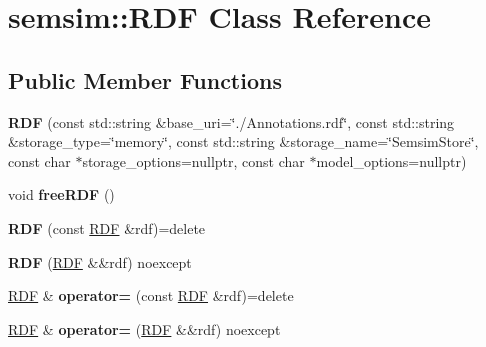 \hypertarget{classsemsim_1_1RDF}{}\section{semsim\+:\+:R\+DF Class Reference}
\label{classsemsim_1_1RDF}
\subsection*{Public Member Functions}
\begin{DoxyCompactItemize}
\item 
\mbox{\label{classsemsim_1_1RDF_adb3d644393c659dc3cd54b29d6bfaec0}} 
{\bfseries R\+DF} (const std\+::string \&base\+\_\+uri=\char`\"{}./Annotations.\+rdf\char`\"{}, const std\+::string \&storage\+\_\+type=\char`\"{}memory\char`\"{}, const std\+::string \&storage\+\_\+name=\char`\"{}Semsim\+Store\char`\"{}, const char $\ast$storage\+\_\+options=nullptr, const char $\ast$model\+\_\+options=nullptr)
\item 
\mbox{\label{classsemsim_1_1RDF_aefd8c1ee16d47a49ce3e2828b7671866}} 
void {\bfseries free\+R\+DF} ()
\item 
\mbox{\label{classsemsim_1_1RDF_a1d640ed0ead4d4699c59641a32f6a81a}} 
{\bfseries R\+DF} (const \hyperlink{classsemsim_1_1RDF}{R\+DF} \&rdf)=delete
\item 
\mbox{\label{classsemsim_1_1RDF_ad6e8d742af0aff97c89746a8eaf50777}} 
{\bfseries R\+DF} (\hyperlink{classsemsim_1_1RDF}{R\+DF} \&\&rdf) noexcept
\item 
\mbox{\label{classsemsim_1_1RDF_a6a8c2040f0fb2be58380d09ff396f11e}} 
\hyperlink{classsemsim_1_1RDF}{R\+DF} \& {\bfseries operator=} (const \hyperlink{classsemsim_1_1RDF}{R\+DF} \&rdf)=delete
\item 
\mbox{\label{classsemsim_1_1RDF_a0195811b138d141d7944ed475b098189}} 
\hyperlink{classsemsim_1_1RDF}{R\+DF} \& {\bfseries operator=} (\hyperlink{classsemsim_1_1RDF}{R\+DF} \&\&rdf) noexcept
\item 
\mbox{\label{classsemsim_1_1RDF_aec42881cdaeeaffdc91238f03a1db2e6}} 

\end{DoxyCompactItemize}
